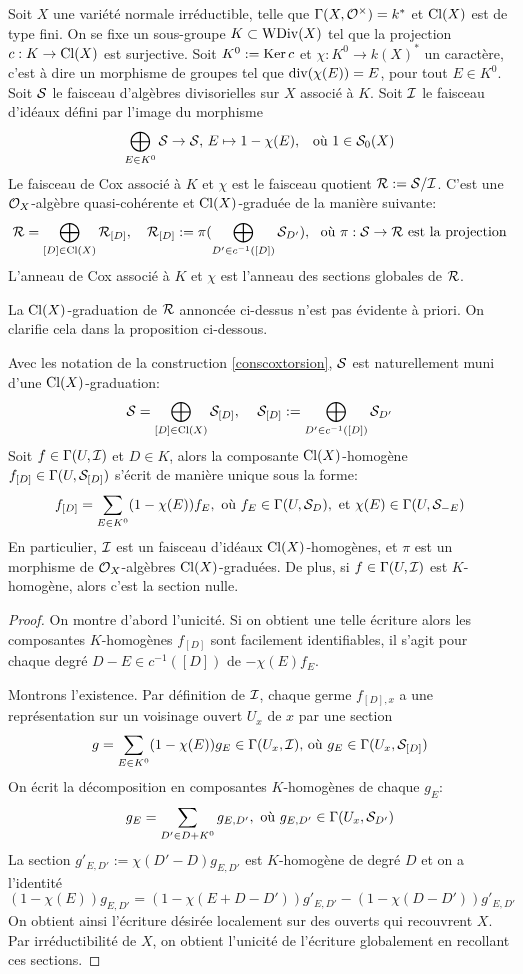 \begin{cons}\label{conscoxtorsion}
Soit $X$ une variété normale irréductible, telle que $\Gamma(X,\mathcal{O}^\times)=k^*$ et $\operatorname{Cl}(X)$ est de type fini. On se fixe un sous-groupe $K\subset \operatorname{WDiv}(X)$ tel que la projection $c:K\rightarrow \operatorname{Cl}(X)$ est surjective. Soit $K^0:=\operatorname{Ker} c$ et $\chi:K^0\rightarrow k(X)^*$ un caractère, c'est à dire un morphisme de groupes tel que $\operatorname{div}(\chi(E))=E$, pour tout $E\in K^0$. Soit $\mathcal{S}$ le faisceau d'algèbres divisorielles sur $X$ associé à $K$. Soit $\mathcal{I}$ le faisceau d'idéaux défini par l'image du morphisme 
$$\bigoplus_{E\in K^0}\mathcal{S}\rightarrow \mathcal{S},\, E\mapsto 1-\chi(E),\,\,\, \text{ où }1\in \mathcal{S}_0(X)$$
Le faisceau de Cox associé à $K$ et $\chi$ est le faisceau quotient $\mathcal{R}:=\mathcal{S}/\mathcal{I}$. C'est une $\mathcal{O}_X$-algèbre quasi-cohérente et $\operatorname{Cl}(X)$-graduée de la manière suivante: 
$$\mathcal{R}=\bigoplus_{[D]\in \operatorname{Cl}(X)}\mathcal{R}_{[D]},\,\,\,\,\,\, \mathcal{R}_{[D]}:=\pi(\bigoplus_{D'\in c^{-1}([D])}\mathcal{S}_{D'}),\,\,\,\, \text{où }\pi:\mathcal{S}\rightarrow \mathcal{R}\text{ est la projection}$$
L'anneau de Cox associé à $K$ et $\chi$ est l'anneau des sections globales de $\mathcal{R}$.
\end{cons}

La $\operatorname{Cl}(X)$-graduation de $\mathcal{R}$ annoncée ci-dessus n'est pas évidente à priori. On clarifie cela dans la proposition ci-dessous.

\begin{prop}\label{coxidealform}
Avec les notation de la construction \ref{conscoxtorsion}, $\mathcal{S}$ est naturellement muni d'une $\operatorname{Cl}(X)$-graduation:
$$\mathcal{S}=\bigoplus_{[D]\in\operatorname{Cl}(X)}\mathcal{S}_{[D]},\,\,\,\,\,\,\, \mathcal{S}_{[D]}:=\bigoplus_{D'\in c^{-1}([D])}\mathcal{S}_{D'}$$
Soit $f\in\Gamma(U,\mathcal{I})$ et $D\in K$, alors la composante $\operatorname{Cl}(X)$-homogène $f_{[D]}\in \Gamma(U,\mathcal{S}_{[D]})$ s'écrit de manière unique sous la forme:
$$f_{[D]}=\sum_{E\in K^0}(1-\chi(E))f_E, \text{  où } f_E\in\Gamma(U,\mathcal{S}_D), \text{ et }\chi(E)\in \Gamma(U, \mathcal{S}_{-E})$$
En particulier, $\mathcal{I}$ est un faisceau d'idéaux $\operatorname{Cl}(X)$-homogènes, et $\pi$ est un morphisme de $\mathcal{O}_X$-algèbres $\operatorname{Cl}(X)$-graduées. De plus, si $f\in \Gamma(U,\mathcal{I})$ est $K$-homogène, alors c'est la section nulle.
\end{prop}
\begin{proof}
On montre d'abord l'unicité. Si on obtient une telle écriture alors les composantes $K$-homogènes  $f_{[D]}$ sont facilement identifiables, il s'agit pour chaque degré $D-E\in c^{-1}([D])$ de $-\chi(E)f_E$.

Montrons l'existence. Par définition de $\mathcal{I}$, chaque germe $f_{[D],x}$ a une représentation sur un voisinage ouvert $U_x$ de $x$ par une section 
$$g=\sum_{E\in K^0}(1-\chi(E))g_E \in \Gamma(U_x, \mathcal{I})\text{, où }g_E\in \Gamma(U_x, \mathcal{S}_{[D]})$$
On écrit la décomposition en composantes $K$-homogènes de chaque $g_E$:
$$g_E=\sum_{D'\in D+K^0}g_{E,D'}, \text{ où } g_{E,D'}\in\Gamma(U_x, \mathcal{S}_{D'})$$
La section $g'_{E,D'}:=\chi(D'-D)g_{E,D'}$ est $K$-homogène de degré $D$ et on a l'identité 
$$(1-\chi(E))g_{E,D'}=(1-\chi(E+D-D'))g'_{E,D'}-(1-\chi(D-D'))g'_{E,D'}$$
On obtient ainsi l'écriture désirée localement sur des ouverts qui recouvrent $X$. Par irréductibilité de $X$, on obtient l'unicité de l'écriture globalement en recollant ces sections.
\end{proof}

